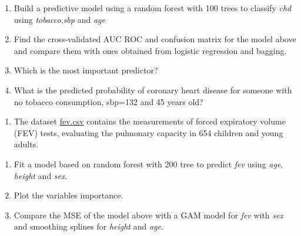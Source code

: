 \documentclass[
]{book}
\providecommand{\tightlist}{%
  \setlength{\itemsep}{0pt}\setlength{\parskip}{0pt}}
\begin{document}
\begin{enumerate}
\def\labelenumi{\alph{enumi})}
\item
  Build a predictive model using a random forest with 100 trees to classify
  \emph{chd} using
  \emph{tobacco},\emph{sbp} and \emph{age}
\item
  Find the cross-validated AUC ROC and confusion matrix for the model above
  and compare them with ones obtained from logistic regression and bagging.
\item
  Which is the most important predictor?
\item
  What is the predicted probability of coronary heart disease for someone
  with no tobacco consumption, sbp=132 and 45 years old?
\end{enumerate}

\begin{enumerate}
\def\labelenumi{\arabic{enumi})}
\setcounter{enumi}{1}
\tightlist
\item
  The dataset \href{https://www.dropbox.com/s/jeqdtq04zl9f0er/FEV.csv?dl=1}{fev.csv}
  contains the measurements of forced expiratory volume (FEV) tests,
  evaluating the pulmonary capacity in 654 children and young adults.
\end{enumerate}

\begin{enumerate}
\def\labelenumi{\alph{enumi})}
\item
  Fit a model based on random forest with 200 tree to predict \emph{fev} using
  \emph{age}, \emph{height} and \emph{sex}.
\item
  Plot the variables importance.
\item
  Compare the MSE of the model above with a GAM model for \emph{fev} with \emph{sex}
  and smoothing splines for \emph{height} and \emph{age}.
\end{enumerate}
\end{document}
